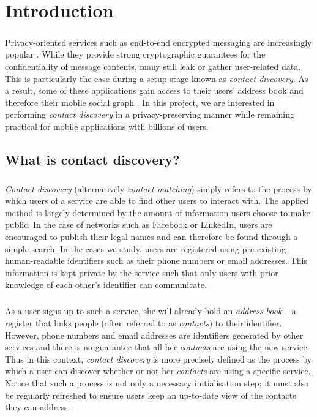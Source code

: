 \chapter{Introduction}
\label{chap:intro}


\paragraph{} Privacy-oriented services such as end-to-end encrypted messaging are increasingly popular \cite{e2epopular}. While they provide strong cryptographic guarantees for the confidentiality of message contents, many still leak or gather user-related data. This is particularly the case during a setup stage known as \textit{contact discovery}. As a result, some of these applications gain access to their users' address book and therefore their mobile social graph \cite{Telegram,WhatsApp}. In this project, we are interested in performing \textit{contact discovery} in a privacy-preserving manner while remaining practical for mobile applications with billions of users.

\section{What is contact discovery?}

\paragraph{} \textit{Contact discovery} (alternatively \textit{contact matching}) simply refers to the process by which users of a service are able to find other users to interact with. The applied method is largely determined by the amount of information users choose to make public. In the case of networks such as Facebook or LinkedIn, users are encouraged to publish their legal names and can therefore be found through a simple search. In the cases we study, users are registered using pre-existing human-readable identifiers such as their phone numbers or email addresses. This information is kept private by the service such that only users with prior knowledge of each other's identifier can communicate.

\paragraph{} As a user signs up to such a service, she will already hold an \textit{address book} -- a register that links people (often referred to as \textit{contacts}) to their identifier. However, phone numbers and email addresses are identifiers generated by other services and there is no guarantee that all her \textit{contacts} are using the new service. Thus in this context, \textit{contact discovery} is more precisely defined as the process by which a user can discover whether or not her \textit{contacts} are using a specific service. Notice that such a process is not only a necessary initialisation step; it must also be regularly refreshed to ensure users keep an up-to-date view of the contacts they can address.



